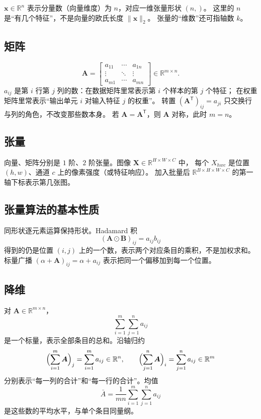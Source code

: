 $\bm{x}\in\mathbb{R}^{n}$ 表示分量数（向量维度）为 $n$，对应一维张量形状 $(n,)$。
这里的 $n$ 是“有几个特征”，不是向量的欧氏长度 $\|\bm{x}\|_2$。
张量的“维数”还可指轴数 $k$。

\subsection{矩阵}

\[
\bm{A}=
\begin{bmatrix}
a_{11}&\cdots&a_{1n}\\
\vdots&\ddots&\vdots\\
a_{m1}&\cdots&a_{mn}
\end{bmatrix}
\in\mathbb{R}^{m\times n}.
\]
$a_{ij}$ 是第 $i$ 行第 $j$ 列的数：在数据矩阵里常表示第 $i$ 个样本的第 $j$ 个特征；
在权重矩阵里常表示“输出单元 $i$ 对输入特征 $j$ 的权重”。
转置 $(\bm{A}^{\mathsf T})_{ij}=a_{ji}$ 只交换行与列的角色，不改变那些数本身。
若 $\bm{A}=\bm{A}^{\mathsf T}$，则 $\bm{A}$ 对称，此时 $m=n$。

\subsection{张量}

向量、矩阵分别是 $1$ 阶、$2$ 阶张量。图像 $\bm{X}\in\mathbb{R}^{H\times W\times C}$ 中，
每个 $X_{hwc}$ 是位置 $(h,w)$、通道 $c$ 上的像素强度（或特征响应）。
加入批量后 $\mathbb{R}^{B\times H\times W\times C}$ 的第一轴下标表示第几张图。

\subsection{张量算法的基本性质}

同形状逐元素运算保持形状。Hadamard 积
\[
(\bm{A}\odot\bm{B})_{ij}=a_{ij}b_{ij}
\]
得到的仍是位置 $(i,j)$ 上的一个数，表示两个对应条目的乘积，不是加权求和。
标量广播 $(\alpha+\bm{A})_{ij}=\alpha+a_{ij}$ 表示把同一个偏移加到每一个位置。

\subsection{降维}

对 $\bm{A}\in\mathbb{R}^{m\times n}$，
\[
\sum_{i=1}^{m}\sum_{j=1}^{n}a_{ij}
\]
是一个标量，表示全部条目的总和。沿轴归约
\[
\Bigl(\sum_{i=1}^{m}\bm{A}\Bigr)_{j}=\sum_{i=1}^{m}a_{ij}\in\mathbb{R}^{n},
\qquad
\Bigl(\sum_{j=1}^{n}\bm{A}\Bigr)_{i}=\sum_{j=1}^{n}a_{ij}\in\mathbb{R}^{m}
\]
分别表示“每一列的合计”和“每一行的合计”。均值
\[
\bar{A}=\frac{1}{mn}\sum_{i=1}^{m}\sum_{j=1}^{n}a_{ij}
\]
是这些数的平均水平，与单个条目同量纲。

